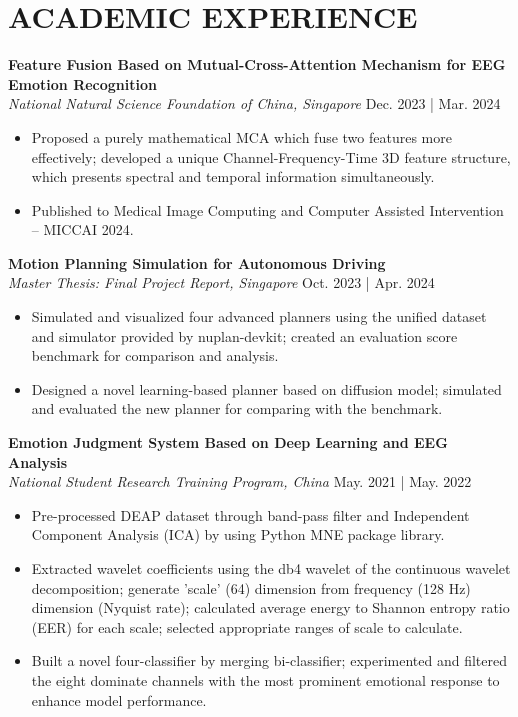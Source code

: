 \documentclass[a4paper,9pt]{extarticle}
\begin{document}
\nocite{*}



\section*{ACADEMIC EXPERIENCE}

\noindent
\textbf{Feature Fusion Based on Mutual-Cross-Attention Mechanism for EEG Emotion Recognition} \\ %
\textit{National Natural Science Foundation of China, Singapore} \hfill Dec. 2023 | Mar. 2024
\begin{itemize}
    \item Proposed a purely mathematical MCA which fuse two features more effectively; developed a unique Channel-Frequency-Time 3D feature structure, which presents spectral and temporal information simultaneously. 
    \item Published to Medical Image Computing and Computer Assisted Intervention -- MICCAI 2024.
\end{itemize}

\noindent
\textbf{Motion Planning Simulation for Autonomous Driving} \\ %
\textit{Master Thesis: Final Project Report, Singapore} \hfill Oct. 2023 | Apr. 2024 %
\begin{itemize}
    \item Simulated and visualized four advanced planners using the unified dataset and simulator provided by nuplan-devkit; created an evaluation score benchmark for comparison and analysis.
    \item Designed a novel learning-based planner based on diffusion model; simulated and evaluated the new planner for comparing with the benchmark.
\end{itemize}

\noindent
\textbf{Emotion Judgment System Based on Deep Learning and EEG Analysis} \\ %
\textit{National Student Research Training Program, China} \hfill May. 2021 | May. 2022 %
\begin{itemize}
    \item Pre-processed DEAP dataset through band-pass filter and Independent Component Analysis (ICA) by using Python MNE package library.
    \item Extracted wavelet coefficients using the db4 wavelet of the continuous wavelet decomposition; generate 'scale' (64) dimension from frequency (128 Hz) dimension (Nyquist rate); calculated average energy to Shannon entropy ratio (EER) for each scale; selected appropriate ranges of scale to calculate.
    \item Built a novel four-classifier by merging bi-classifier; experimented and filtered the eight dominate channels with the most prominent emotional response to enhance model performance.
\end{itemize}
\end{document}
